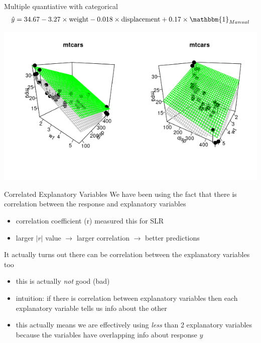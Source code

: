 \documentclass{beamer}
\begin{document}
\begin{frame}{Multiple quantiative with categorical}
\begin{align*}
\hat{y} = 34.67 - 3.27 \times \text{weight} - 0.018 \times \text{displacement} + 0.17 \times \mathbbm{1}_{Manual}
\end{align*}
\begin{center}
\includegraphics[scale=0.5]{wt_disp_am1.png}
\end{center}
\end{frame}

\begin{frame}{Correlated Explanatory Variables}
We have been using the fact that there is correlation between the response and explanatory variables
\begin{itemize}
    \item correlation coefficient (r) measured this for SLR
    \item larger $|r|$ value $\rightarrow$ larger correlation $\rightarrow$ better predictions
\end{itemize} \vspace{10mm}

It actually turns out there can be correlation between the explanatory variables too
\begin{itemize}
    \item this is actually \textit{not} good (bad)
    \item intuition: if there is correlation between explanatory variables then each explanatory variable tells us info about the other
    \item this actually means we are effectively using \textit{less} than 2 explanatory variables because the variables have overlapping info about response $y$
\end{itemize}
\end{frame}
\end{document}
